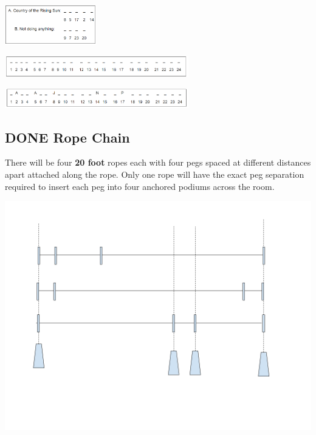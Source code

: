 \documentclass[11pt]{article}
\begin{document}
\begin{center}
\includegraphics[width=4cm]{./img/acrostic-1.png}
\end{center}

\begin{center}
\includegraphics[width=8cm]{./img/acrostic-2.png}
\end{center}

\begin{center}
\includegraphics[width=8cm]{./img/acrostic-3.png}
\end{center}

\subsection{{\bfseries\sffamily DONE} Rope Chain}
\label{sec:orgf1e9b04}
There will be four \textbf{20 foot} ropes each with four pegs spaced at different distances apart attached along the rope. Only one rope will have the exact peg separation required to insert each peg into four anchored podiums across the room.

\begin{center}
\includegraphics[width=.9\linewidth]{./img/pt-rc-001.png}
\end{center}
\end{document}
